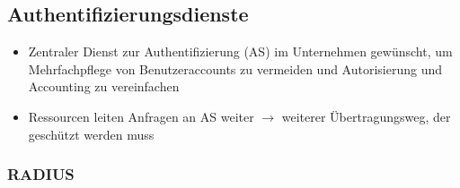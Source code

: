 \subsection{Authentifizierungsdienste}
\begin{itemize}
	\item Zentraler Dienst zur Authentifizierung (AS) im Unternehmen gewünscht, um Mehrfachpflege von Benutzeraccounts zu vermeiden und Autorisierung und Accounting zu vereinfachen
	\item Ressourcen leiten Anfragen an AS weiter \(\rightarrow\) weiterer Übertragungsweg, der geschützt werden muss
\end{itemize}

\subsubsection{RADIUS}
